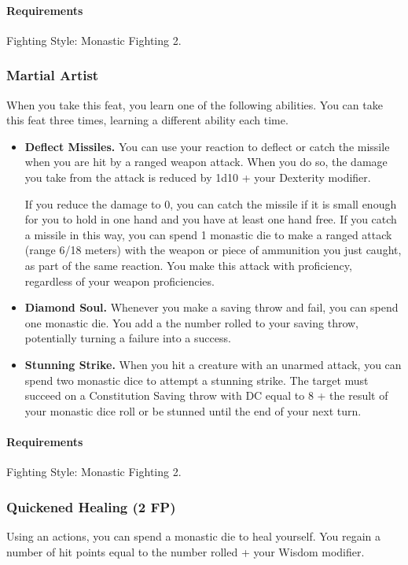     \paragraph{Requirements} Fighting Style: Monastic Fighting 2.
\subsubsection{Martial Artist} \label{feat::martialartist}
    When you take this feat, you learn one of the following abilities.
    You can take this feat three times, learning a different ability each time.
    \begin{itemize}
        \item \textbf{Deflect Missiles.} You can use your reaction to deflect or catch the missile when you are hit by a ranged weapon attack.
        When you do so, the damage you take from the attack is reduced by 1d10 + your Dexterity modifier.

        If you reduce the damage to 0, you can catch the missile if it is small enough for you to hold in one hand and you have at least one hand free.
        If you catch a missile in this way, you can spend 1 monastic die to make a ranged attack (range 6/18 meters) with the weapon or piece of ammunition you just caught, as part of the same reaction.
        You make this attack with proficiency, regardless of your weapon proficiencies.

        \item \textbf{Diamond Soul.} Whenever you make a saving throw and fail, you can spend one monastic die.
        You add a the number rolled to your saving throw, potentially turning a failure into a success.

        \item \textbf{Stunning Strike.} When you hit a creature with an unarmed attack, you can spend two monastic dice to attempt a stunning strike.
        The target must succeed on a Constitution Saving throw with DC equal to 8 + the result of your monastic dice roll or be stunned until the end of your next turn.
    \end{itemize}

    \paragraph{Requirements} Fighting Style: Monastic Fighting 2.
\subsubsection{Quickened Healing (2 FP)} \label{feat::quickenedhealing}
    Using an actions, you can spend a monastic die to heal yourself.
    You regain a number of hit points equal to the number rolled + your Wisdom modifier.
